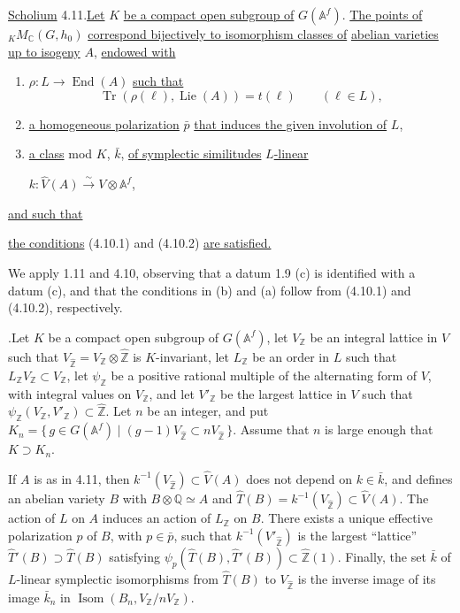\documentclass[10pt]{article}
\newcommand{\Af}{\mathbb A^f}
\newcommand{\C}{\mathbb C}
\newcommand{\Q}{\mathbb Q}
\newcommand{\Z}{\mathbb Z}
\newcommand{\Isom}{\operatorname{Isom}}
\newcommand{\Lie}{\operatorname{Lie}}
\newcommand{\End}{\operatorname{End}}
\newcommand{\Tr}{\operatorname{Tr}}
\begin{document}
\noindent \uline{Scholium} 4.11.\quad \uline{Let} $K$ \uline{be a compact open subgroup of} $G(\Af)$. \uline{The points of} ${}_K M_{\C}(G,h_0)$ \uline{correspond bijectively to isomorphism classes of} \uline{abelian varieties up to isogeny} $A$, \uline{endowed with}
\begin{enumerate}[label=(\alph*)]
\item $\rho:L\longrightarrow\End(A)$ \uline{such that}
\[
\Tr(\rho(\ell),\Lie(A))=t(\ell)\qquad(\ell\in L),
\]
\item \uline{a homogeneous polarization} $\bar p$ \uline{that induces the given involution of} $L$,
\item \uline{a class} mod $K$, $\bar k$, \uline{of symplectic similitudes} \uline{$L$-linear}

$k:\widehat V(A)\xrightarrow{\sim}V\otimes\Af$,
\end{enumerate}
\uline{and such that}
\begin{list}{}{\setlength{\leftmargin}{4em}\setlength{\labelwidth}{3em}\setlength{\labelsep}{1em}\setlength{\topsep}{.4em}\setlength{\itemsep}{0pt}}
\item[(*)] \uline{the conditions} (4.10.1) and (4.10.2) \uline{are satisfied.}
\end{list}
We apply 1.11 and 4.10, observing that a datum 1.9 (c) is identified with a datum (c), and that the conditions in (b) and (a) follow from (4.10.1) and (4.10.2), respectively.

.\quad Let $K$ be a compact open subgroup of $G(\Af)$, let $V_\Z$ be an integral lattice in $V$ such that $V_{\widehat{\Z}}=V_\Z\otimes\widehat{\Z}$ is $K$-invariant, let $L_\Z$ be an order in $L$ such that $L_\Z V_\Z\subset V_\Z$, let $\psi_\Z$ be a positive rational multiple of the alternating form of $V$, with integral values on $V_\Z$, and let $V'_\Z$ be the largest lattice in $V$ such that $\psi_\Z(V_\Z,V'_\Z)\subset\widehat{\Z}$. Let $n$ be an integer, and put $K_n=\{\,g\in G(\Af)\mid (g-1)V_{\widehat{\Z}}\subset nV_{\widehat{\Z}}\,\}$. Assume that $n$ is large enough that $K\supset K_n$.

If $A$ is as in 4.11, then $k^{-1}(V_{\widehat{\Z}})\subset\widehat V(A)$ does not depend on $k\in\bar k$, and defines an abelian variety $B$ with $B\otimes\Q\simeq A$ and $\widehat T(B)=k^{-1}(V_{\widehat{\Z}})\subset\widehat V(A)$.
The action of $L$ on $A$ induces an action of $L_\Z$ on $B$. There exists a unique effective polarization $p$ of $B$, with $p\in\bar p$, such that $k^{-1}(V'_{\widehat{\Z}})$ is the largest ``lattice'' $\widehat T'(B)\supset\widehat T(B)$ satisfying $\psi_p(\widehat T(B),\widehat T'(B))\subset\widehat{\Z}(1)$. Finally, the set $\bar k$ of $L$-linear symplectic isomorphisms from $\widehat T(B)$ to $V_{\widehat{\Z}}$ is the inverse image of its image $\bar k_n$ in $\Isom(B_n,V_\Z/nV_\Z)$.
\end{document}
